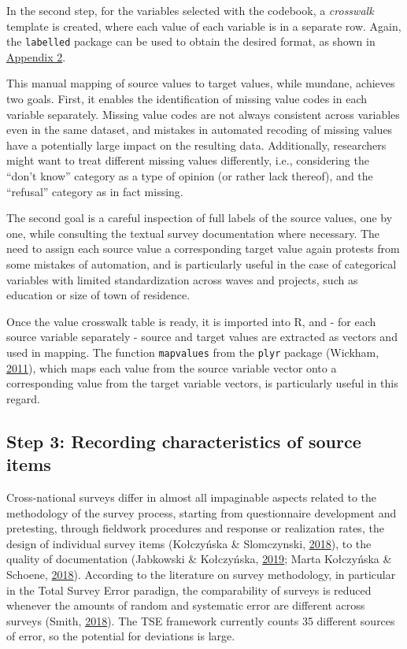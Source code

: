 \documentclass[12pt,]{article}
\begin{document}
In the second step, for the variables selected with the codebook, a \emph{crosswalk} template is created, where each value of each variable is in a separate row. Again, the \texttt{labelled} package can be used to obtain the desired format, as shown in \protect\hyperlink{appendix2}{Appendix 2}.

This manual mapping of source values to target values, while mundane, achieves two goals. First, it enables the identification of missing value codes in each variable separately. Missing value codes are not always consistent across variables even in the same dataset, and mistakes in automated recoding of missing values have a potentially large impact on the resulting data. Additionally, researchers might want to treat different missing values differently, i.e., considering the ``don't know'' category as a type of opinion (or rather lack thereof), and the ``refusal'' category as in fact missing.

The second goal is a careful inspection of full labels of the source values, one by one, while consulting the textual survey documentation where necessary. The need to assign each source value a corresponding target value again protests from some mistakes of automation, and is particularly useful in the case of categorical variables with limited standardization across waves and projects, such as education or size of town of residence.

Once the value crosswalk table is ready, it is imported into R, and - for each source variable separately - source and target values are extracted as vectors and used in mapping. The function \texttt{mapvalues} from the \texttt{plyr} package (Wickham, \protect\hyperlink{ref-Wickham2011}{2011}), which maps each value from the source variable vector onto a corresponding value from the target variable vectors, is particularly useful in this regard.

\hypertarget{step-3-recording-characteristics-of-source-items}{%
\subsection{Step 3: Recording characteristics of source items}\label{step-3-recording-characteristics-of-source-items}}

Cross-national surveys differ in almost all impaginable aspects related to the methodology of the survey process, starting from questionnaire development and pretesting, through fieldwork procedures and response or realization rates, the design of individual survey items (Kołczyńska \& Slomczynski, \protect\hyperlink{ref-KolczynskaSlomczynski2018}{2018}), to the quality of documentation (Jabkowski \& Kołczyńska, \protect\hyperlink{ref-Jabkowski2019}{2019}; Marta Kołczyńska \& Schoene, \protect\hyperlink{ref-KolczynskaSchoene2018}{2018}). According to the literature on survey methodology, in particular in the Total Survey Error paradign, the comparability of surveys is reduced whenever the amounts of random and systematic error are different across surveys (Smith, \protect\hyperlink{ref-Smith2018}{2018}). The TSE framework currently counts 35 different sources of error, so the potential for deviations is large.
\end{document}
